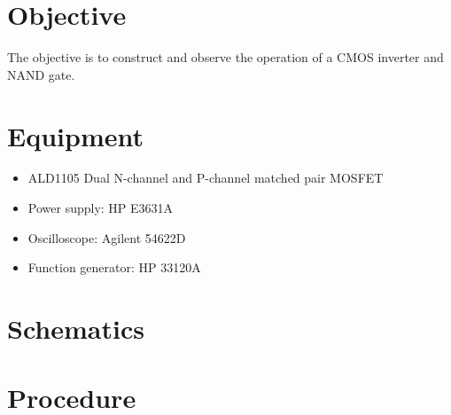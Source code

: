 

\section{Objective}
\label{sec:objective}

The objective is to construct and observe the operation of a CMOS inverter and NAND gate.

\section{Equipment}
\label{sec:equipment}

\begin{itemize}
\item ALD1105 Dual N-channel and P-channel matched pair MOSFET
\item Power supply: HP E3631A
\item Oscilloscope: Agilent 54622D
\item Function generator: HP 33120A
\end{itemize}

 \section{Schematics}
 \label{sec:schematics}


\section{Procedure}
\label{sec:procedure}

